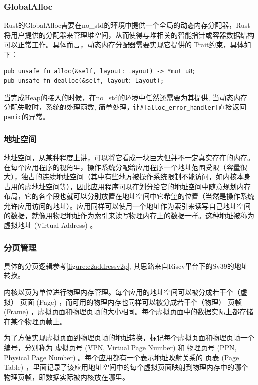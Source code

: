 \subsubsection{GlobalAlloc}
Rust的GlobalAlloc需要在no\_std的环境中提供一个全局的动态内存分配器，Rust将用户提供的分配器来管理堆空间，从而使得与堆相关的智能指针或容器数据结构可以正常工作。具体而言，动态内存分配器需要实现它提供的 Trait约束，具体如下：

\begin{lstlisting}[caption=GlobalAlloc的Trait约束]
pub unsafe fn alloc(&self, layout: Layout) -> *mut u8;
pub unsafe fn dealloc(&self, layout: Layout);
\end{lstlisting}

当完成Heap的接入的时候，在no\_std的环境中任然还需要为其提供, 当动态内存分配失败时，系统的处理函数, 简单处理，让\verb|#[alloc_error_handler]|直接返回\verb|panic|的异常。

\subsubsection{地址空间}

地址空间，从某种程度上讲，可以将它看成一块巨大但并不一定真实存在的内存。在每个应用程序的视角里，操作系统分配给应用程序一个地址范围受限（容量很大），独占的连续地址空间（其中有些地方被操作系统限制不能访问，如内核本身占用的虚地址空间等），因此应用程序可以在划分给它的地址空间中随意规划内存布局，它的各个段也就可以分别放置在地址空间中它希望的位置（当然是操作系统允许应用访问的地址）。应用同样可以使用一个地址作为索引来读写自己地址空间的数据，就像用物理地址作为索引来读写物理内存上的数据一样。这种地址被称为 虚拟地址 (Virtual Address) 。


\subsubsection{分页管理}

具体的分页逻辑参考\autoref{figure:c2addressv2p}, 其思路来自Riscv平台下的Sv39的地址转换。

内核以页为单位进行物理内存管理。每个应用的地址空间可以被分成若干个（虚拟） 页面 (Page) ，而可用的物理内存也同样可以被分成若干个（物理） 页帧 (Frame) ，虚拟页面和物理页帧的大小相同。每个虚拟页面中的数据实际上都存储在某个物理页帧上。

为了方便实现虚拟页面到物理页帧的地址转换，标记每个虚拟页面和物理页帧一个编号，分别称为 虚拟页号 (VPN, Virtual Page Number) 和 物理页号 (PPN, Physical Page Number) 。每个应用都有一个表示地址映射关系的 页表 (Page Table) ，里面记录了该应用地址空间中的每个虚拟页面映射到物理内存中的哪个物理页帧，即数据实际被内核放在哪里。

